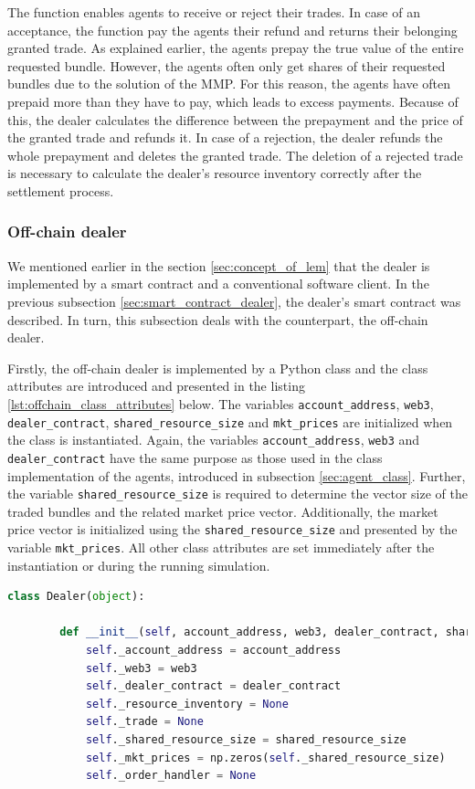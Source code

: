 The function enables agents to receive or reject their trades. 
In case of an acceptance, the function pay the agents their refund
and returns their belonging granted trade.
As explained earlier, the agents prepay the true value of the entire requested bundle.
However, the agents often only get shares of their requested bundles due to the solution of the 
MMP.
For this reason, the agents have often prepaid more than they have to pay, which leads to 
excess payments. Because of this, the dealer calculates the difference between the prepayment 
and the price of the granted trade and refunds it.
In case of a rejection, the dealer refunds the whole prepayment and deletes the granted trade.
The deletion of a rejected trade is necessary to calculate the dealer's resource inventory correctly
after the settlement process.


\subsubsection{Off-chain dealer}
\label{sec:off_chain_component}
We mentioned earlier in the section \ref{sec:concept_of_lem} that the 
dealer is implemented by a smart contract and a conventional software client.
In the previous subsection \ref{sec:smart_contract_dealer}, the 
dealer's smart contract was described. In turn, 
this subsection deals with the counterpart, the off-chain dealer. 

Firstly, the off-chain dealer is implemented by a Python class and the 
class attributes are introduced and presented in the listing \ref{lst:offchain_class_attributes} below.
The variables \verb|account_address|, \verb|web3|, 
\verb|dealer_contract|, \verb|shared_resource_size| and \verb|mkt_prices| 
are initialized when the class is instantiated.
Again, the variables \verb|account_address|, \verb|web3| and 
\verb|dealer_contract| have the same purpose as those used in the class implementation of 
the agents, introduced in subsection \ref{sec:agent_class}.
Further, the variable \verb|shared_resource_size| is required to determine the vector size 
of the traded bundles and the related market price vector. 
Additionally, the market price vector is initialized using the \verb|shared_resource_size|
and presented by the variable \verb|mkt_prices|.
All other class attributes are set immediately after 
the instantiation or during the running simulation.

\begin{lstlisting}[float=htbp, label=lst:offchain_class_attributes, caption=Overview of the off-chain dealer's class attributes, language=Python]
    class Dealer(object):

        def __init__(self, account_address, web3, dealer_contract, shared_resource_size):
            self._account_address = account_address
            self._web3 = web3
            self._dealer_contract = dealer_contract
            self._resource_inventory = None
            self._trade = None
            self._shared_resource_size = shared_resource_size
            self._mkt_prices = np.zeros(self._shared_resource_size)
            self._order_handler = None
\end{lstlisting}

